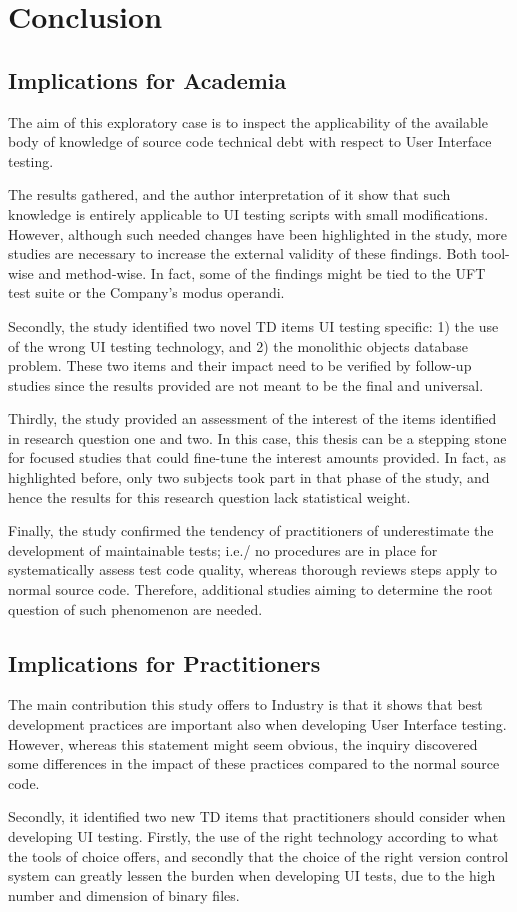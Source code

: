 \chapter{Conclusion}

\section{Implications for Academia}
The aim of this exploratory case is to inspect the applicability of the available body of knowledge of source code technical debt with respect to User Interface testing.

The results gathered, and the author interpretation of it show that such knowledge is entirely applicable to UI testing scripts with small modifications. However, although such needed changes have been highlighted in the study, more studies are necessary to increase the external validity of these findings. Both tool-wise and method-wise. In fact, some of the findings might be tied to the UFT test suite or the Company's modus operandi.

 Secondly, the study identified two novel TD items UI testing specific: 1) the use of the wrong UI testing technology, and 2) the monolithic objects database problem. These two items and their impact need to be verified by follow-up studies since the results provided are not meant to be the final and universal.

Thirdly, the study provided an assessment of the interest of the items identified in research question one and two. In this case,  this thesis can be a stepping stone for focused studies that could fine-tune the interest amounts provided. In fact, as highlighted before, only two subjects took part in that phase of the study, and hence the results for this research question lack statistical weight.

Finally, the study confirmed the tendency of practitioners of underestimate the development of maintainable tests; i.e./ no procedures are in place for systematically assess test code quality, whereas thorough reviews steps apply to normal source code. Therefore, additional studies aiming to determine the root question of such phenomenon are needed.


\section{Implications for Practitioners}
The main contribution this study offers to Industry is that it shows that best development practices are important also when developing User Interface testing. However, whereas this statement might seem obvious, the inquiry discovered some differences in the impact of these practices compared to the normal source code.

Secondly,  it identified two new TD items that practitioners should consider when developing UI testing. Firstly, the use of the right technology according to what the tools of choice offers, and secondly that the choice of the right version control system can greatly lessen the burden when developing UI tests, due to the high number and dimension of binary files. 